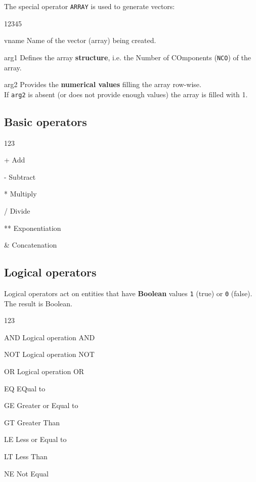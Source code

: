 The special operator \texttt{ARRAY} is used to generate vectors:

 
\begin{DLtt}{12345}
\item[vname] Name of the vector (array) being created.
\item[arg1]  Defines the array {\bf structure},
             i.e. the Number of COmponents (\texttt{NCO}) of the array.
\item[arg2]  Provides the {\bf numerical values} filling the array
             row-wise.\\
             If \texttt{arg2} is absent (or does not provide enough
             values) the array is filled with 1.
\end{DLtt}

\subsection{Basic operators}
 
\begin{DLtt}{123}
\item[+]  Add
\item[-]  Subtract
\item[*]  Multiply
\item[/]  Divide
\item[**] Exponentiation
\item[\&] Concatenation
\end{DLtt}


\subsection{Logical operators}
 
Logical operators act on entities that have
{\bf Boolean} values \texttt{1} (true) or \texttt{0} (false).
The result is Boolean.

\begin{DLtt}{123}
\item[AND] Logical operation AND
\item[NOT] Logical operation NOT
\item[OR]  Logical operation OR
\item[EQ]  EQual to
\item[GE]  Greater or Equal to
\item[GT]  Greater Than
\item[LE]  Less or Equal to
\item[LT]  Less Than
\item[NE]  Not Equal
\end{DLtt}

